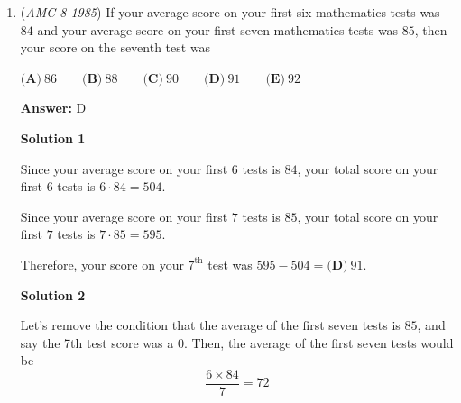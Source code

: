 \begin{enumerate}
 $\text{(A)}\ 1 \qquad \text{(B)}\ 3 \qquad \text{(C)}\ 5 \qquad \text{(D)}\ 6 \qquad \text{(E)}\ 10$

 \textbf{Answer: }D



\textbf{Solution 1}

Let $x$ be half the number of boys.  Then there are $2x$ boys and $3x$ girls. So $2x+3x=5x=30$ and thus $x = 6$. Therefore, between the number of girls and the number of boys is $3x-2x=x=\boxed{\textbf{(D)}\ 6}$.

 



\textbf{Solution 2}

Since the ratio of boys to girls is $2 : 3$, $\frac{2}{2+3} = \frac{2}{5}$ of the students are boys and $\frac{3}{2+3} = \frac{3}{5}$ are girls.  Thus the difference between the number of boys and the number of girls is $\frac{3}{5} - \frac{2}{5} = \frac{1}{5}$ of the number of students in the class, that is $\frac{1}{5} \cdot 30 = \boxed{\textbf{(D)}\ 6}$.

 


	\item (\textit{AMC 8 1985}) If your average score on your first six mathematics tests was $84$ and your average score on your first seven mathematics tests was $85$, then your score on the seventh test was


 $\textbf{(A)}\ 86 \qquad \textbf{(B)}\ 88 \qquad \textbf{(C)}\ 90 \qquad \textbf{(D)}\ 91 \qquad \textbf{(E)}\ 92$

 \textbf{Answer: }D



\textbf{Solution 1}

Since your average score on your first $6$ tests is $84$, your total score on your first $6$ tests is $6\cdot84=504$. 

 Since your average score on your first $7$ tests is $85$, your total score on your first $7$ tests is $7\cdot85= 595$.  

 Therefore, your score on your $7^{\text{th}}$ test was $595-504=\boxed{\textbf{(D)}\ 91}$.

 



\textbf{Solution 2}

Let's remove the condition that the average of the first seven tests is $85$, and say the 7th test score was a $0$. Then, the average of the first seven tests would be 
 \[\frac{6\times 84}{7}=72\]


\end{enumerate}
